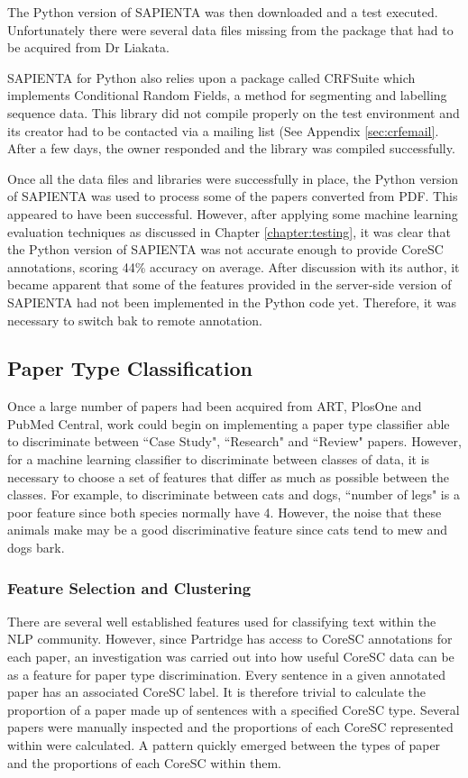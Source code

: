 The Python version of SAPIENTA was then downloaded and a test executed.
Unfortunately there were several data files missing from the package that had
to be acquired from Dr Liakata. 

SAPIENTA for Python also relies upon a package called CRFSuite which implements
Conditional Random Fields, a method for segmenting and labelling sequence
data\cite{CRFsuite}. This library did not compile properly on the test
environment and its creator had to be contacted via a mailing list (See
Appendix \ref{sec:crfemail}. After a few days, the owner responded and the
library was compiled successfully.  

Once all the data files and libraries were successfully in place, the Python
version of SAPIENTA was used to process some of the papers converted from PDF.
This appeared to have been successful. However, after applying some machine
learning evaluation techniques as discussed in Chapter \ref{chapter:testing},
it was clear that the Python version of SAPIENTA was not accurate enough to
provide CoreSC annotations, scoring 44\% accuracy on average. After discussion
with its author, it became apparent that some of the features provided in the
server-side version of SAPIENTA had not been implemented in the Python code
yet. Therefore, it was necessary to switch bak to remote annotation.

\subsection{Paper Type Classification}

Once a large number of papers had been acquired from ART, PlosOne and PubMed
Central, work could begin on implementing a paper type classifier able to
discriminate between ``Case Study", ``Research" and ``Review" papers. However,
for a machine learning classifier to discriminate between classes of data, it
is necessary to choose a set of features that differ as much as possible
between the classes. For example, to discriminate between cats and dogs,
``number of legs" is a poor feature since both species normally have 4.
However, the noise that these animals make may be a good discriminative feature
since cats tend to mew and dogs bark. 

\subsubsection{ Feature Selection and Clustering}

There are several well established features used for classifying text within
the NLP community. However, since Partridge has access to CoreSC annotations
for each paper, an investigation was carried out into how useful CoreSC data
can be as a feature for paper type discrimination. Every sentence in a given
annotated paper has an associated CoreSC label. It is therefore trivial to
calculate the proportion of a paper made up of sentences with a specified
CoreSC type. Several papers were manually inspected and the proportions of each
CoreSC represented within were calculated. A pattern quickly emerged between
the types of paper and the proportions of each CoreSC within them. 

